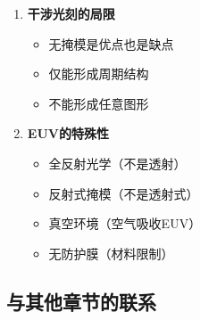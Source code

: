 \documentclass[UTF8,12pt,a4paper]{ctexart}
\begin{document}
\begin{enumerate}
    \item \textbf{干涉光刻的局限}
    \begin{itemize}
        \item 无掩模是优点也是缺点
        \item 仅能形成周期结构
        \item 不能形成任意图形
    \end{itemize}
    
    \item \textbf{EUV的特殊性}
    \begin{itemize}
        \item 全反射光学（不是透射）
        \item 反射式掩模（不是透射式）
        \item 真空环境（空气吸收EUV）
        \item 无防护膜（材料限制）
    \end{itemize}
\end{enumerate}

\subsection{与其他章节的联系}
\end{document}

